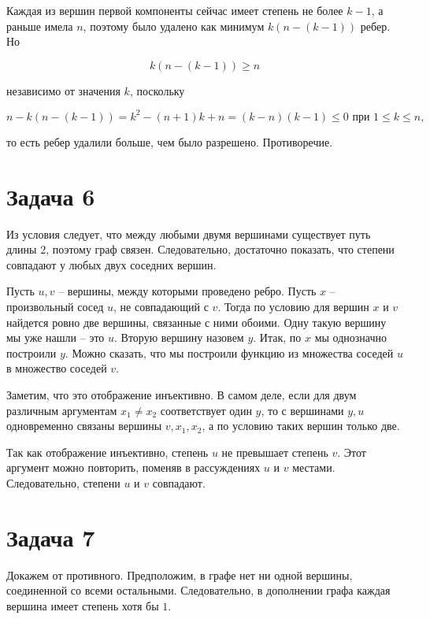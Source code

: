 \documentclass{article}
\begin{document}
	Каждая из вершин первой компоненты сейчас имеет степень не более $k - 1$, а раньше имела $n$, поэтому было удалено как минимум $k (n - (k - 1))$ ребер. Но

	\begin{equation*}
		k (n - (k - 1)) \ge n
	\end{equation*}

	независимо от значения $k$, поскольку

	\begin{equation*}
		n - k (n - (k - 1)) = k^2 - (n+1)k + n = (k - n)(k - 1) \le 0 \text{ при } 1 \le k \le n,
	\end{equation*}

	то есть ребер удалили больше, чем было разрешено. Противоречие.


	\section*{Задача 6}

	Из условия следует, что между любыми двумя вершинами существует путь длины $2$, поэтому граф связен. Следовательно, достаточно показать, что степени совпадают у любых двух соседних вершин.

	Пусть $u, v$ -- вершины, между которыми проведено ребро. Пусть $x$ -- произвольный сосед $u$, не совпадающий с $v$. Тогда по условию для вершин $x$ и $v$ найдется ровно две вершины, связанные с ними обоими. Одну такую вершину мы уже нашли -- это $u$. Вторую вершину назовем $y$. Итак, по $x$ мы однозначно построили $y$. Можно сказать, что мы построили функцию из множества соседей $u$ в множество соседей $v$.

	Заметим, что это отображение инъективно. В самом деле, если для двум различным аргументам $x_1 \ne x_2$ соответствует один $y$, то с вершинами $y, u$ одновременно связаны вершины $v, x_1, x_2$, а по условию таких вершин только две.

	Так как отображение инъективно, степень $u$ не превышает степень $v$. Этот аргумент можно повторить, поменяв в рассуждениях $u$ и $v$ местами. Следовательно, степени $u$ и $v$ совпадают.


	\section*{Задача 7}

	Докажем от противного. Предположим, в графе нет ни одной вершины, соединенной со всеми остальными. Следовательно, в дополнении графа каждая вершина имеет степень хотя бы $1$.
\end{document}
